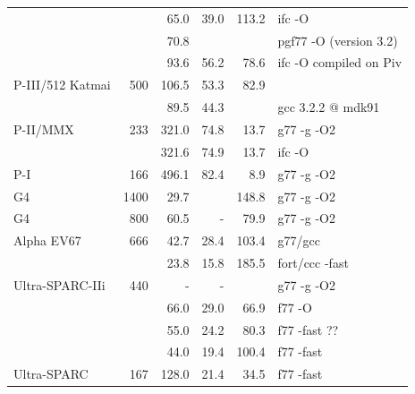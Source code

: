 \documentclass[10pt,dvips]{article}
\begin{document}
\begin{table}[htbp]
\begin{tabular}{|l|r|r|r|r|l|}
 		& 	&	 65.0 & 39.0  & 113.2 & ifc -O \\
		&	&	 70.8 &       &       & pgf77 -O (version 3.2) \\
		&	&	 93.6 & 56.2  &  78.6 & ifc -O compiled on Piv \\
P-III/512 Katmai & 500  &	106.5 & 53.3  &  82.9 & \\  %
                &       &        89.5 & 44.3  &       & gcc 3.2.2 @ mdk91 \\
P-II/MMX        & 233   &       321.0 & 74.8  &  13.7 & g77 -g -O2 \\ %
		&	&	321.6 & 74.9  &  13.7 & ifc -O \\
P-I             & 166   &       496.1 & 82.4  &   8.9 & g77 -g -O2 \\ %
\hline
G4              & 1400  &        29.7 &       & 148.8 & g77 -g -O2\\ %
G4              &  800  &        60.5 & -     &  79.9 & g77 -g -O2 \\ %
\hline
Alpha EV67	& 666   &        42.7 & 28.4  & 103.4 & g77/gcc \\ %
		&       &        23.8 & 15.8  & 185.5 & fort/ccc -fast \\
Ultra-SPARC-IIi &  440  &	   -  &   -   &       & g77 -g -O2\\   %
		&  	&	 66.0 & 29.0  &  66.9 & f77 -O \\
		&  	&	 55.0 & 24.2  &  80.3 & f77 -fast  ?? \\
		&	&	 44.0 & 19.4  & 100.4 & f77 -fast \\
Ultra-SPARC     &  167  &       128.0 & 21.4  &  34.5 & f77 -fast \\
 \hline
\end{tabular}
\end{table}
\end{document}

